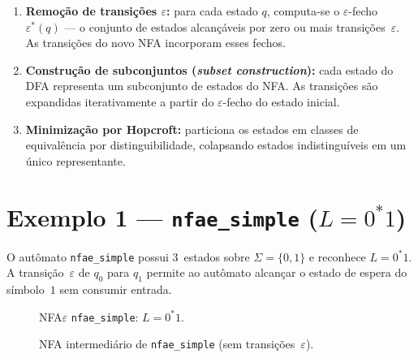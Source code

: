 \documentclass[sumario=abnt-6027-2012]{ifes8}
\newcommand{\eps}{\varepsilon}
\begin{document}
\begin{enumerate}
  \item \textbf{Remoção de transições $\varepsilon$:} para cada estado $q$,
    computa-se o $\varepsilon$-fecho $\varepsilon^*(q)$ — o conjunto de
    estados alcançáveis por zero ou mais transições~$\varepsilon$.
    As transições do novo NFA incorporam esses fechos.
  \item \textbf{Construção de subconjuntos (\textit{subset construction}):}
    cada estado do DFA representa um subconjunto de estados do NFA.
    As transições são expandidas iterativamente a partir do
    $\varepsilon$-fecho do estado inicial.
  \item \textbf{Minimização por Hopcroft:} particiona os estados em classes
    de equivalência por distinguibilidade, colapsando estados
    indistinguíveis em um único representante.
\end{enumerate}

\section{Exemplo 1 --- \texttt{nfae\_simple} \texorpdfstring{($L = 0^*1$)}{(L = 0*1)}}

O autômato \texttt{nfae\_simple} possui 3~estados sobre $\Sigma = \{0,1\}$
e reconhece $L = 0^*1$. A transição~$\varepsilon$ de $q_0$ para $q_1$
permite ao autômato alcançar o estado de espera do símbolo~$1$ sem consumir
entrada.

\begin{figure}[H]
  \centering
  \caption{NFA$\varepsilon$ \texttt{nfae\_simple}: $L = 0^*1$.}
  \label{fig:nfae-simple-nfae}
\end{figure}

\begin{figure}[H]
  \centering
  \caption{NFA intermediário de \texttt{nfae\_simple} (sem transições~$\varepsilon$).}
  \label{fig:nfae-simple-nfa}
\end{figure}
\end{document}
